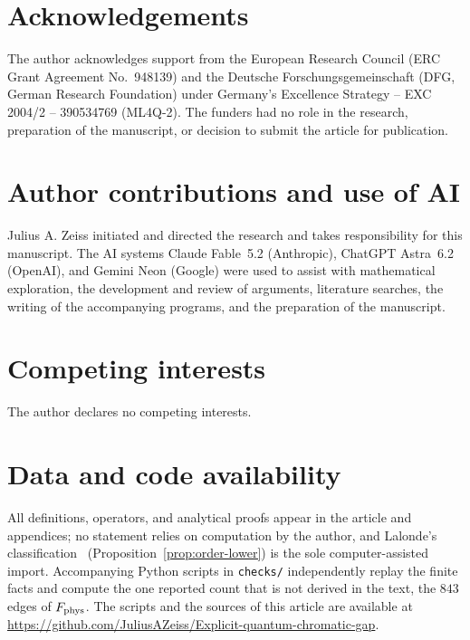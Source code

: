 \documentclass[a4paper,onecolumn,11pt,unpublished]{quantumarticle}
\theoremstyle{definition}
\begin{document}
\section*{Acknowledgements}
The author acknowledges support from the European Research Council (ERC Grant Agreement No.~948139) and the Deutsche Forschungsgemeinschaft (DFG, German Research Foundation) under Germany's Excellence Strategy -- EXC 2004/2 -- 390534769 (ML4Q-2). The funders had no role in the research, preparation of the manuscript, or decision to submit the article for publication.

\section*{Author contributions and use of AI}
Julius A. Zeiss initiated and directed the research and takes responsibility for this manuscript. The AI systems Claude Fable~5.2 (Anthropic), ChatGPT Astra~6.2 (OpenAI), and Gemini Neon (Google) were used to assist with mathematical exploration, the development and review of arguments, literature searches, the writing of the accompanying programs, and the preparation of the manuscript.

\section*{Competing interests}
The author declares no competing interests.

\section*{Data and code availability}
All definitions, operators, and analytical proofs appear in the article and appendices; no statement relies on computation by the author, and Lalonde's classification~\cite{La} (Proposition~\ref{prop:order-lower}) is the sole computer-assisted import. Accompanying Python scripts in \texttt{checks/} independently replay the finite facts and compute the one reported count that is not derived in the text, the $843$ edges of $F_{\rm phys}$. The scripts and the sources of this article are available at \url{https://github.com/JuliusAZeiss/Explicit-quantum-chromatic-gap}.

\appendix
{}










\end{document}
